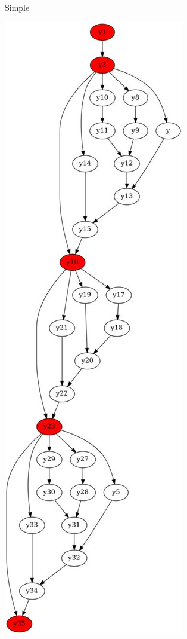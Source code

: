 \documentclass[../diploma.tex]{subfiles}
\begin{document}
\begin{figure}[h]
\begin{subfigure}{0.24\textwidth}
    \caption{Simple}
    \end{subfigure}
    \begin{subfigure}{0.24\textwidth}
    \includegraphics[width=0.9\linewidth]{graph_simple2.jpeg}

\end{subfigure}
\end{figure}
\end{document}
